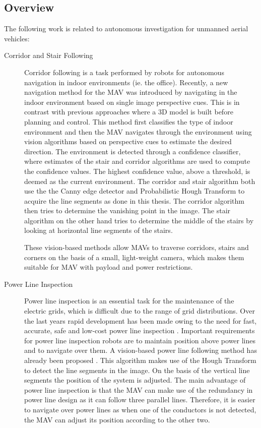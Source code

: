 \documentclass[a4paper]{article}
\begin{document}
\subsection{Overview}
The following work is related to autonomous investigation for unmanned aerial vehicles:
\begin{description}
\item[Corridor and Stair Following] Corridor following is a task performed by robots for autonomous navigation in indoor environments (ie. the office). Recently, a new navigation method for the MAV \cite{Bills2011} was introduced by navigating in the indoor environment based on single image perspective cues. This is in contrast with previous approaches where a 3D model is built before planning and control. This method first classifies the type of indoor environment and then the MAV navigates through the environment using vision algorithms based on perspective cues to estimate the desired direction. The environment is detected through a confidence classifier, where estimates of the stair and corridor algorithms are used to compute the confidence values. The highest confidence value, above a threshold, is deemed as the current environment. The corridor and stair algorithm both use the the Canny edge detector and Probabilistic Hough Transform to acquire the line segments as done in this thesis. The corridor algorithm then tries to determine the vanishing point in the image. The stair algorithm on the other hand tries to determine the middle of the stairs by looking at horizontal line segments of the stairs.

These vision-based methods allow MAVs to traverse corridors, stairs and corners on the basis of a small, light-weight camera, which makes them suitable for MAV with payload and power restrictions.

\item[Power Line Inspection] Power line inspection is an essential task for the maintenance of the electric grids, which is difficult due to the range of grid distributions. Over the last years rapid development has been made owing to the need for fast, accurate, safe and low-cost power line inspection \cite{Katrasnik2010}. Important requirements for power line inspection robots are to maintain position above power lines and to navigate over them. A vision-based power line following method has already been proposed \cite{Golightly2005}. This algorithm makes use of the Hough Transform to detect the line segments in the image. On the basis of the vertical line segments the position of the system is adjusted. The main advantage of power line inspection is that the MAV can make use of the redundancy in power line design as it can follow three parallel lines. Therefore, it is easier to navigate over power lines as when one of the conductors is not detected, the MAV can adjust its position according to the other two.


\end{description}
\end{document}
